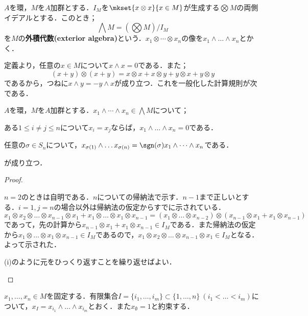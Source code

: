 \begin{defi}[外積代数]
	$A$を環，$M$を$A$加群とする．$I_M$を$\mkset{x\otimes x}{x\in M}$が生成する$\bigotimes M$の両側イデアルとする．このとき；
	\[\bigwedge M=(\bigotimes M)/I_M\]
	を$M$の\textbf{外積代数(exterior algebra)}という．$x_1\otimes\cdots\otimes x_n$の像を$x_1\wedge\dots\wedge x_n$とかく．
\end{defi}

定義より，任意の$x\in M$について$x\wedge x=0$である．また；
\[(x+y)\otimes(x+y)=x\otimes x+x\otimes y+y\otimes x+y\otimes y\]
であるから，つねに$x\wedge y=-y\wedge x$が成り立つ．これを一般化した計算規則が次である．

\begin{prop}
	$A$を環，$M$を$A$加群とする．$x_1\wedge\cdots\wedge x_n\in\bigwedge M$について；
	\begin{sakura}
		\item ある$1\leq i\neq j\leq n$について$x_i=x_j$ならば，$x_1\wedge\dots\wedge x_n=0$である．
		\item 任意の$\sigma\in S_n$について，$x_{\sigma(1)}\wedge\dots x_{\sigma(n)}=\sgn(\sigma)x_1\wedge\dots\wedge x_n$である．
	\end{sakura}
	が成り立つ．
\end{prop}

\begin{proof}
	\begin{sakura}
		\item $n=2$のときは自明である．$n$についての帰納法で示す．$n-1$まで正しいとする．$i=1,j=n$の場合以外は帰納法の仮定からすでに示されている．
		\[x_1\otimes x_2\otimes\dots\otimes x_{n-1}\otimes x_1+x_1\otimes\dots\otimes x_1\otimes x_{n-1}=(x_1\otimes\dots\otimes x_{n-2})\otimes(x_{n-1}\otimes x_1+x_1\otimes x_{n-1})\]
		であって，先の計算から$x_{n-1}\otimes x_1+x_1\otimes x_{n-1}\in I_M$である．また帰納法の仮定から$x_1\otimes\dots\otimes x_1\otimes x_{n-1}\in I_M$であるので，$x_1\otimes x_2\otimes\dots\otimes x_{n-1}\otimes x_1\in I_M$となる．よって示された．
		
		\item (i)のように元をひっくり返すことを繰り返せばよい．
	\end{sakura}
\end{proof}

$x_1,\dots,x_n\in M$を固定する．有限集合$I=\{i_1,\dots,i_m\}\subset\{1,\dots,n\}~(i_1<\dots<i_m)$について，$x_I=x_{i_1}\wedge\dots\wedge x_{i_m}$とおく．また$x_\emptyset=1$と約束する．


